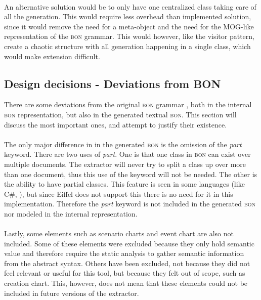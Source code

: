 \paragraph{}
An alternative solution would be to only have one centralized class taking care of all the generation. This would require less overhead than implemented solution, since it would remove the need for a meta-object and the need for the MOG-like representation of the \textsc{bon} grammar. This would however, like the visitor pattern, create a chaotic structure with all generation happening in a single class, which would make extension difficult.

\subsection{Design decisions - Deviations from BON}
\label{deviations_from_bon}There are some deviations from the original \textsc{bon} grammar \cite[pp.~352-359]{walden1995}, both in the internal \textsc{bon} representation, but also in the generated textual \textsc{bon}. This section will discuss the most important ones, and attempt to justify their existence. 

\paragraph{}
The only major difference in in the generated \textsc{bon} is the omission of the \textit{part} keyword. There are two uses of \textit{part}. One is that one class in \textsc{bon} can exist over multiple documents. The extractor will never try to split a class up over more than one document, thus this use of the keyword will not be needed. The other is the ability to have partial classes. This feature is seen in some languages (like C\#, \cite{msdn2009}), but since Eiffel does not support this there is no need for it in this implementation. Therefore the \textit{part} keyword is not included in the generated \textsc{bon} nor modeled in the internal representation.

\paragraph{}
Lastly, some elements such as scenario charts and event chart are also not included. Some of these elements were excluded because they only hold semantic value and therefore require the static analysis to gather semantic information from the abstract syntax. Others have been excluded, not because they did not feel relevant or useful for this tool, but because they felt out of scope, such as creation chart. This, however, does not mean that these elements could not be included in future versions of the extractor.
